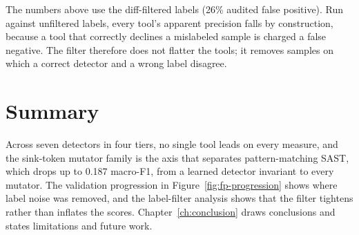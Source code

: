 The numbers above use the diff-filtered labels (26\% audited false positive). Run
against unfiltered labels, every tool's apparent precision falls by construction,
because a tool that correctly declines a mislabeled sample is charged a false
negative. The filter therefore does not flatter the tools; it removes samples on
which a correct detector and a wrong label disagree.

\section{Summary}

Across seven detectors in four tiers, no single tool leads on every measure, and
the sink-token mutator family is the axis that separates pattern-matching SAST,
which drops up to 0.187 macro-F1, from a learned detector invariant to every
mutator. The validation progression in Figure~\ref{fig:fp-progression} shows
where label noise was removed, and the label-filter analysis shows that the
filter tightens rather than inflates the scores. Chapter~\ref{ch:conclusion}
draws conclusions and states limitations and future work.
